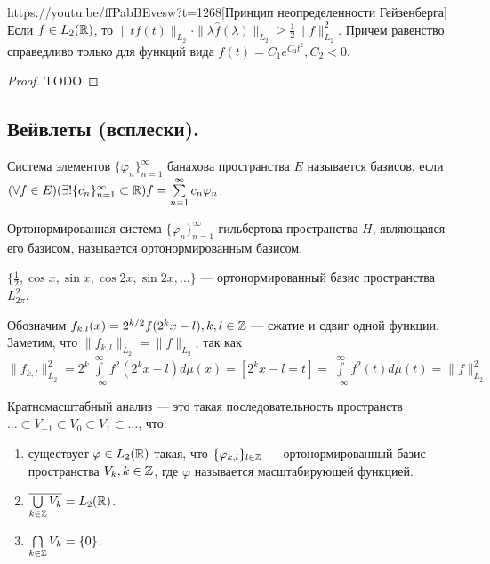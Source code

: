 \begin{linkthm}{https://youtu.be/ffPabBEvesw?t=1268}[Принцип неопределенности Гейзенберга]\ \\
	Если $f\in L_2(\mathbb{R})$, то $\|tf(t)\|_{L_2}\cdot \|\lambda\hat{f}(\lambda)\|_{L_2}\geqslant\frac{1}{2}\|f\|_{L_2}^2$. Причем равенство справедливо только для функций вида $f(t)=C_1e^{C_2t^2}, C_2<0$.
\end{linkthm}

\begin{proof}
	TODO
\end{proof}

\subsection{Вейвлеты (всплески).}
\begin{Def}
	Система элементов $\{\varphi_n\}_{n=1}^\infty$ банахова пространства $E$ называется базисов, если $(\forall f\in E)(\exists !\{c_n\}_{n=1}^\infty\subset\mathbb{R}) f=\sum\limits_{n=1}^\infty c_n\varphi_n$.
\end{Def}

\begin{Def}
	Ортонормированная система $\{\varphi_n\}_{n=1}^\infty$ гильбертова пространства $H$, являющаяся его базисом, называется ортонормированным базисом.
\end{Def}

\begin{example}
	$\{\frac{1}{2}, \cos x, \sin x, \cos 2x, \sin 2x, \ldots\}$ --- ортонормированный базис пространства $L_{2\pi}^2$.
\end{example}
Обозначим $f_{k,l}(x)=2^{k/2}f(2^kx-l),k,l\in\mathbb{Z}$ --- сжатие и сдвиг одной функции. Заметим, что $\|f_{k,l}\|_{L_2}=\|f\|_{L_2}$, так как $\|f_{k,l}\|^2_{L_2}=2^k\int\limits_{-\infty}^\infty f^2(2^kx-l)d\mu(x)=[2^kx-l=t]=\int\limits_{-\infty}^\infty f^2(t)d\mu(t)=\|f\|^2_{L_2}$
\begin{Def}
	Кратномасштабный анализ --- это такая последовательность пространств $\ldots\subset V_{-1} \subset V_{0} \subset V_{1} \subset \ldots$, что:
	\begin{enumerate}
		\item существует $\varphi\in L_2(\mathbb{R})$ такая, что $\{\varphi_{k,l}\}_{l\in\mathbb{Z}}$ --- ортонормированный базис пространства $V_k, k\in\mathbb{Z}$, где $\varphi$ называется масштабирующей функцией.
		\item $\overline{\bigcup\limits_{k\in\mathbb{Z}}V_k}=L_2(\mathbb{R})$.
		\item $\bigcap\limits_{k\in\mathbb{Z}}V_k=\{0\}$.
	\end{enumerate}
\end{Def}









